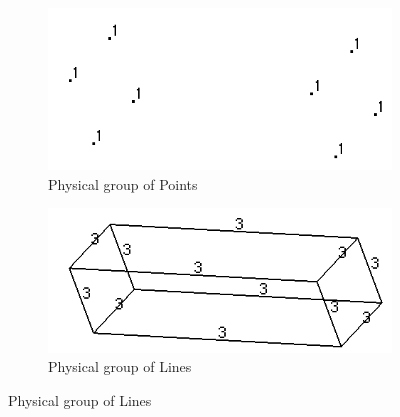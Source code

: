 \documentclass[11pt]{article}
\begin{document}
\begin{figure}[h]

  \centering
  \begin{subfigure}[b]{0.35\textwidth}
    \includegraphics[width=\textwidth]{Images/PhysicalPoints.png}
    \caption{Physical group of Points}
  \end{subfigure}
  \begin{subfigure}[b]{0.35\textwidth}
    \includegraphics[width=\textwidth]{Images/PhysicalLines.png}
    \caption{Physical group of Lines}
  \end{subfigure}


\end{figure}
\end{document}
